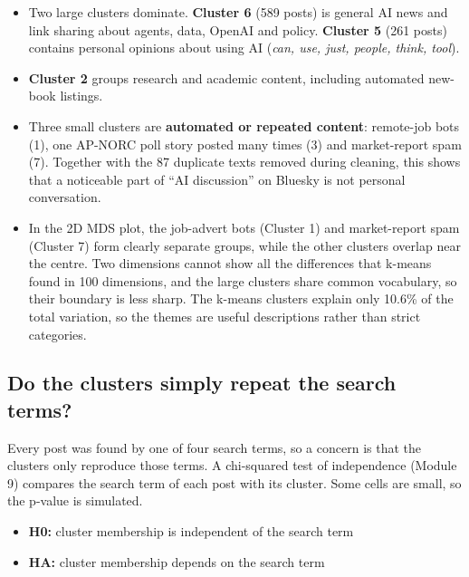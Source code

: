 \documentclass[
  10pt,
]{article}
\newenvironment{Shaded}{\begin{snugshade}}{\end{snugshade}}
\newcommand{\FunctionTok}[1]{\textcolor[rgb]{0.13,0.29,0.53}{\textbf{#1}}}
\newcommand{\NormalTok}[1]{#1}
\newcommand{\OtherTok}[1]{\textcolor[rgb]{0.56,0.35,0.01}{#1}}
\newcommand{\SpecialCharTok}[1]{\textcolor[rgb]{0.81,0.36,0.00}{\textbf{#1}}}
\providecommand{\tightlist}{%
  \setlength{\itemsep}{0pt}\setlength{\parskip}{0pt}}
\begin{document}
\begin{itemize}
\tightlist
\item
  Two large clusters dominate. \textbf{Cluster 6} (589 posts) is general
  AI news and link sharing about agents, data, OpenAI and policy.
  \textbf{Cluster 5} (261 posts) contains personal opinions about using
  AI (\emph{can, use, just, people, think, tool}).
\item
  \textbf{Cluster 2} groups research and academic content, including
  automated new-book listings.
\item
  Three small clusters are \textbf{automated or repeated content}:
  remote-job bots (1), one AP-NORC poll story posted many times (3) and
  market-report spam (7). Together with the 87 duplicate texts removed
  during cleaning, this shows that a noticeable part of ``AI
  discussion'' on Bluesky is not personal conversation.
\item
  In the 2D MDS plot, the job-advert bots (Cluster 1) and market-report
  spam (Cluster 7) form clearly separate groups, while the other
  clusters overlap near the centre. Two dimensions cannot show all the
  differences that k-means found in 100 dimensions, and the large
  clusters share common vocabulary, so their boundary is less sharp. The
  k-means clusters explain only 10.6\% of the total variation, so the
  themes are useful descriptions rather than strict categories.
\end{itemize}

\subsection{Do the clusters simply repeat the search
terms?}\label{do-the-clusters-simply-repeat-the-search-terms}

Every post was found by one of four search terms, so a concern is that
the clusters only reproduce those terms. A chi-squared test of
independence (Module 9) compares the search term of each post with its
cluster. Some cells are small, so the p-value is simulated.

\begin{itemize}
\tightlist
\item
  \textbf{H0:} cluster membership is independent of the search term
\item
  \textbf{HA:} cluster membership depends on the search term
\end{itemize}

\begin{Shaded}
\end{Shaded}
\end{document}
